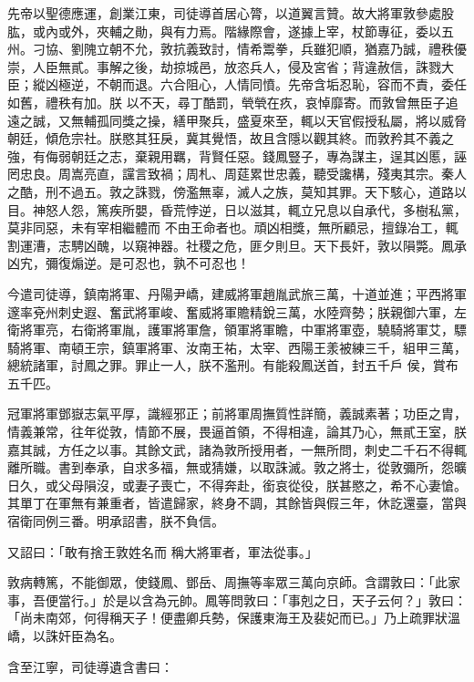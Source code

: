 \begin{pinyinscope}
 先帝以聖德應運，創業江東，司徒導首居心膂，以道翼言贊。故大將軍敦參處股肱，或內或外，夾輔之勛，與有力焉。階緣際會，遂據上宰，杖節專征，委以五州。刁協、劉隗立朝不允，敦抗義致討，情希鬻拳，兵雖犯順，猶嘉乃誠，禮秩優崇，人臣無貳。事解之後，劫掠城邑，放恣兵人，侵及宮省；背違赦信，誅戮大臣；縱凶極逆，不朝而退。六合阻心，人情同憤。先帝含垢忍恥，容而不責，委任如舊，禮秩有加。朕
 以不天，尋丁酷罰，煢煢在疚，哀悼靡寄。而敦曾無臣子追遠之誠，又無輔孤同獎之操，繕甲聚兵，盛夏來至，輒以天官假授私屬，將以威脅朝廷，傾危宗社。朕愍其狂戾，冀其覺悟，故且含隱以觀其終。而敦矜其不義之強，有侮弱朝廷之志，棄親用羈，背賢任惡。錢鳳豎子，專為謀主，逞其凶慝，誣罔忠良。周嵩亮直，讜言致禍；周札、周莚累世忠義，聽受讒構，殘夷其宗。秦人之酷，刑不過五。敦之誅戮，傍濫無辜，滅人之族，莫知其罪。天下駭心，道路以目。神怒人怨，篤疾所嬰，昏荒悖逆，日以滋其，輒立兄息以自承代，多樹私黨，莫非同惡，未有宰相繼體而
 不由王命者也。頑凶相獎，無所顧忌，擅錄冶工，輒割運漕，志騁凶醜，以窺神器。社稷之危，匪夕則旦。天下長奸，敦以隕斃。鳳承凶宄，彌復煽逆。是可忍也，孰不可忍也！



 今遣司徒導，鎮南將軍、丹陽尹嶠，建威將軍趙胤武旅三萬，十道並進；平西將軍邃率兗州刺史遐、奮武將軍峻、奮威將軍贍精銳三萬，水陸齊勢；朕親御六軍，左衛將軍亮，右衛將軍胤，護軍將軍詹，領軍將軍瞻，中軍將軍壺，驍騎將軍艾，驃騎將軍、南頓王宗，鎮軍將軍、汝南王祐，太宰、西陽王羕被練三千，組甲三萬，總統諸軍，討鳳之罪。罪止一人，朕不濫刑。有能殺鳳送首，封五千戶
 侯，賞布五千匹。



 冠軍將軍鄧嶽志氣平厚，識經邪正；前將軍周撫質性詳簡，義誠素著；功臣之胄，情義兼常，往年從敦，情節不展，畏逼首領，不得相違，論其乃心，無貳王室，朕嘉其誠，方任之以事。其餘文武，諸為敦所授用者，一無所問，刺史二千石不得輒離所職。書到奉承，自求多福，無或猜嫌，以取誅滅。敦之將士，從敦彌所，怨曠日久，或父母隕沒，或妻子喪亡，不得奔赴，銜哀從役，朕甚愍之，希不心妻愴。其單丁在軍無有兼重者，皆遣歸家，終身不調，其餘皆與假三年，休訖還臺，當與宿衛同例三番。明承詔書，朕不負信。



 又詔曰：「敢有捨王敦姓名而
 稱大將軍者，軍法從事。」



 敦病轉篤，不能御眾，使錢鳳、鄧岳、周撫等率眾三萬向京師。含謂敦曰：「此家事，吾便當行。」於是以含為元帥。鳳等問敦曰：「事剋之日，天子云何？」敦曰：「尚未南郊，何得稱天子！便盡卿兵勢，保護東海王及裴妃而已。」乃上疏罪狀溫嶠，以誅奸臣為名。



 含至江寧，司徒導遺含書曰：




\end{pinyinscope}
